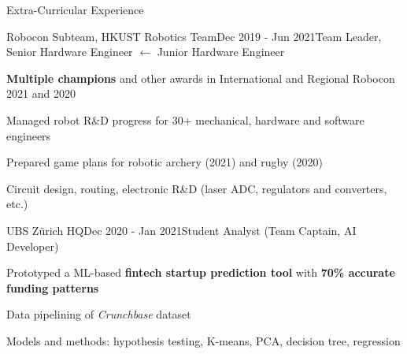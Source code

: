 \documentclass{resume}
\begin{document}
\newpage

\begin{rSection}{Extra-Curricular Experience}
    
    \begin{rSubsection}{Robocon Subteam, HKUST Robotics Team}{Dec 2019 - Jun 2021}{Team Leader, Senior Hardware Engineer $\leftarrow$ Junior Hardware Engineer}{}
        \item \textbf{Multiple champions} and other awards in International and Regional Robocon 2021 and 2020
        \item Managed robot R\&D progress for 30+ mechanical, hardware and software engineers
        \item Prepared game plans for robotic archery (2021) and rugby (2020)
        \item Circuit design, routing, electronic R\&D (laser ADC, regulators and converters, etc.)
    \end{rSubsection}

    \begin{rSubsection}{UBS Zürich HQ}{Dec 2020 - Jan 2021}{Student Analyst (Team Captain, AI Developer)}{}
        \item Prototyped a ML-based \textbf{fintech startup prediction tool} with \textbf{70\% accurate funding patterns}
        \item Data pipelining of \emph{Crunchbase} dataset
        \item Models and methods: hypothesis testing, K-means, PCA, decision tree, regression
    \end{rSubsection}

\end{rSection}
\end{document}
